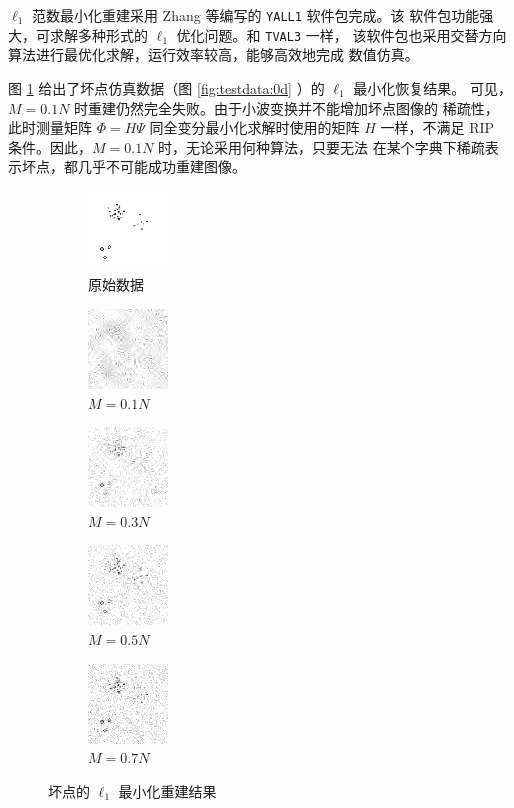 $\ell_1$ 范数最小化重建采用 Zhang 等编写的 \verb|YALL1| 软件包完成。该
软件包功能强大，可求解多种形式的 $\ell_1$ 优化问题。和 \verb|TVAL3| 一样，
该软件包也采用交替方向算法进行最优化求解，运行效率较高，能够高效地完成
数值仿真。

图 \ref{fig:l10d} 给出了坏点仿真数据（图 
\ref{fig:testdata:0d} ）的 $\ell_1$ 最小化恢复结果。
可见， $M = 0.1 N$ 时重建仍然完全失败。由于小波变换并不能增加坏点图像的
稀疏性，此时测量矩阵 $\Phi = H \Psi$ 同全变分最小化求解时使用的矩阵 $H$
一样，不满足 RIP 条件。因此，$M = 0.1N$ 时，无论采用何种算法，只要无法
在某个字典下稀疏表示坏点，都几乎不可能成功重建图像。

\begin{figure}
\centering
\begin{subfigure}[t]{1.1in}
	\includegraphics{Figure/testdata/0d.png}
	\caption{原始数据}
\end{subfigure}
\begin{subfigure}[t]{1.1in}
	\includegraphics{Figure/L1/0d10.png}
	\caption{$M = 0.1 N$}
\end{subfigure}
\begin{subfigure}[t]{1.1in}
	\includegraphics{Figure/L1/0d30.png}
	\caption{$M = 0.3 N$}
\end{subfigure}
\begin{subfigure}[t]{1.1in}
	\includegraphics{Figure/L1/0d50.png}
	\caption{$M = 0.5 N$}
\end{subfigure}
\begin{subfigure}[t]{1.1in}
	\includegraphics{Figure/L1/0d70.png}
	\caption{$M = 0.7 N$}
\end{subfigure}
\caption{坏点的 $\ell_1$ 最小化重建结果}
\label{fig:l10d}
\end{figure}

